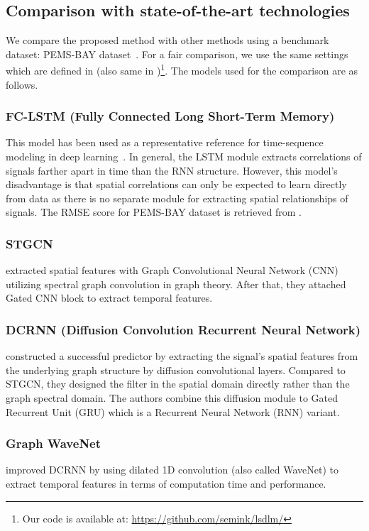 \documentclass[journal]{IEEEtran}
\begin{document}
 




\subsection{Comparison with state-of-the-art technologies}
We compare the proposed method with other methods using a benchmark dataset: PEMS-BAY dataset~\cite{li2018diffusion}.
For a fair comparison, we use the same settings which are defined in \cite{li2018diffusion} (also same in \cite{xu2018graph})\footnote{Our code is available at: \url{https://github.com/semink/lsdlm/}}.
The models used for the comparison are as follows.

\subsubsection{FC-LSTM (Fully Connected Long Short-Term Memory)} 
This model has been used as a representative reference for time-sequence modeling in deep learning~\cite{hochreiter1997long}.
In general, the LSTM module extracts correlations of signals farther apart in time than the RNN structure. However, this model's disadvantage is that spatial correlations can only be expected to learn directly from data as there is no separate module for extracting spatial relationships of signals.
The RMSE score for PEMS-BAY dataset is retrieved from \cite{li2018diffusion}.
\subsubsection{STGCN} \textcite{yu2018spatio} extracted spatial features with Graph Convolutional Neural Network (CNN) utilizing spectral graph convolution in graph theory. After that, they attached Gated CNN block to extract temporal features.
\subsubsection{DCRNN (Diffusion Convolution Recurrent Neural Network)} 
\textcite{li2018diffusion} constructed a successful predictor by extracting the signal's spatial features from the underlying graph structure by diffusion convolutional layers. 
Compared to STGCN, they designed the filter in the spatial domain directly rather than the graph spectral domain. 
The authors combine this diffusion module to Gated Recurrent Unit (GRU) which is a Recurrent Neural Network (RNN) variant.
\subsubsection{Graph WaveNet}
\textcite{xu2018graph} improved DCRNN by using dilated 1D convolution (also called WaveNet) to extract temporal features in terms of computation time and performance.
\end{document}

